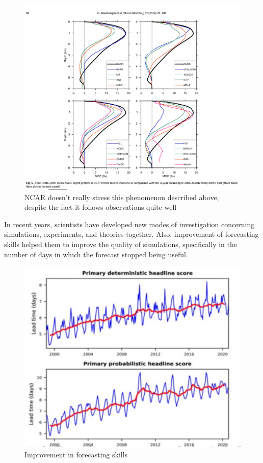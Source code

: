 \begin{figure}[htpb]
    \centering
    \includegraphics[width=0.6\linewidth]{uploads/image3.png}
    \caption{NCAR doesn't really stress this phenomenon described above, despite the fact it follows observations quite well}
    
\end{figure}

In recent years, scientists have developed new modes of investigation concerning simulations, experiments, and theories together. Also, improvement of forecasting skills helped them to improve the quality of simulations, specifically in the number of days in which the forecast stopped being useful. 
\begin{figure}[htpb]
    \centering
    \includegraphics[width=0.5\linewidth]{uploads/image5.png}
    \caption{Improvement in forecasting skills}
 
\end{figure}

